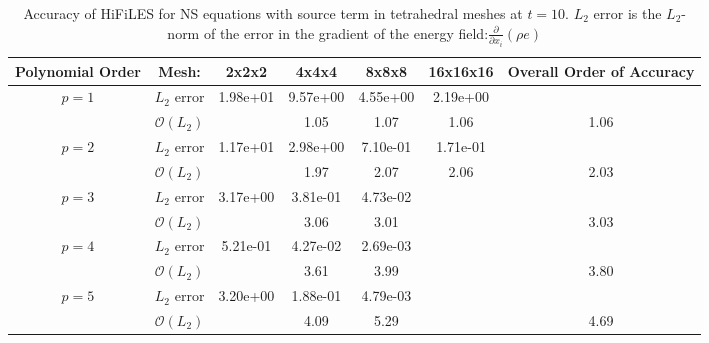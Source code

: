 \begin{table}[htbp]
\centering
\begin{tabular}{ c c c c c c c} 
  
 Polynomial Order & Mesh: & 2x2x2 & 4x4x4 & 8x8x8 & 16x16x16 & Overall Order of Accuracy \\ 
 \hline 
 \multirow{2}{*}{$p = 1$} & $L_2$ error & 1.98e+01 & 9.57e+00 & 4.55e+00 & 2.19e+00 &   \\ 
  
   & $\mathcal{O}(L_2)$ &   & 1.05 & 1.07 & 1.06 & 1.06 \\ 
 \hline 
 \multirow{2}{*}{$p = 2$} & $L_2$ error & 1.17e+01 & 2.98e+00 & 7.10e-01 & 1.71e-01 &   \\ 
  
   & $\mathcal{O}(L_2)$ &   & 1.97 & 2.07 & 2.06 & 2.03 \\ 
 \hline 
 \multirow{2}{*}{$p = 3$} & $L_2$ error & 3.17e+00 & 3.81e-01 & 4.73e-02 &   &   \\ 
  
   & $\mathcal{O}(L_2)$ &   & 3.06 & 3.01 &   & 3.03 \\ 
 \hline 
 \multirow{2}{*}{$p = 4$} & $L_2$ error & 5.21e-01 & 4.27e-02 & 2.69e-03 &   &   \\ 
  
   & $\mathcal{O}(L_2)$ &   & 3.61 & 3.99 &   & 3.80 \\ 
 \hline 
 \multirow{2}{*}{$p = 5$} & $L_2$ error & 3.20e+00 & 1.88e-01 & 4.79e-03 &   &   \\ 
  
   & $\mathcal{O}(L_2)$ &   & 4.09 & 5.29 &   & 4.69 \\ 
 \hline 
 \end{tabular}
\caption{Accuracy of HiFiLES for NS equations with source term in tetrahedral meshes at $t = 10$. $L_2$ error is the $L_2$-norm of the error in the gradient of the energy field:$\frac{\partial}{\partial x_i} (\rho e)$}
\label{table:tetsError2} 
 \end{table}
